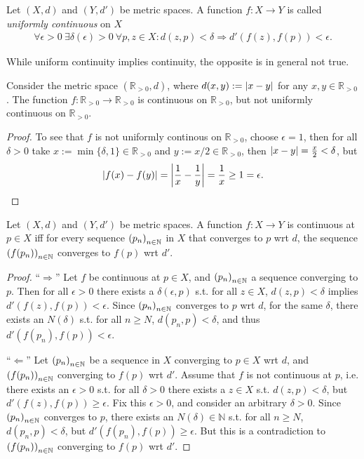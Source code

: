 \begin{defn}
	Let $(X, d)$ and $(Y, d')$ be metric spaces. A function $f: X\rightarrow Y$ is called \textit{uniformly continuous} on $X$
	\begin{align}
		\forall\epsilon > 0\ \exists \delta(\epsilon) > 0\ \forall p, z\in X: d\left(z, p\right) < \delta \Rightarrow d'\left( f\left(z\right), f\left(p\right) \right) < \epsilon.
	\end{align}
\end{defn}

\begin{remark}
	While uniform continuity implies continuity, the opposite is in general not true.
\end{remark}

\begin{exmp}
	Consider the metric space $(\mathbb R_{> 0}, d)$, where $d(x, y) := \abs{x - y}$ for any $x, y\in\mathbb R_{> 0}$. The function $f: \mathbb R_{>0} \to \mathbb R_{> 0}$ is continuous on $\mathbb R_{> 0}$, but not uniformly continuous on $\mathbb R_{> 0}$. 
\end{exmp}

\begin{proof}
	To see that $f$ is not uniformly continous on $\mathbb R_{> 0}$, choose $\epsilon = 1$, then for all $\delta > 0$ take $x := \min\{\delta, 1\}\in\mathbb R_{> 0}$ and $y := x/2\in\mathbb R_{> 0}$, then $\abs{x - y} = \frac{x}{2} < \delta$, but
	$$\abs{f(x) - f(y)} = \abs{\frac{1}{x} - \frac{1}{y}} = \frac{1}{x} \geq 1 = \epsilon.$$
\end{proof}

\begin{theorem}
	Let $(X, d)$ and $(Y, d')$ be metric spaces. A function $f: X\to Y$ is continuous at $p\in X$ iff for every sequence $\seq[p_n]$ in $X$ that converges to $p$ wrt $d$, the sequence $\seq[f(p_n)]$ converges to $f(p)$ wrt $d'$.
\end{theorem}

\begin{proof}
	\enquote{$\Longrightarrow$} Let $f$ be continuous at $p\in X$, and $\seq[p_n]$ a sequence converging to $p$. Then for all $\epsilon > 0$ there exists a $\delta(\epsilon, p)$ s.t. for all $z\in X$, $d(z, p) < \delta$ implies $d'(f(z), f(p)) < \epsilon$. Since $\seq[p_n]$ converges to $p$ wrt $d$, for the same $\delta$, there exists an $N(\delta)$ s.t. for all $n\geq N$, $d(p_n, p) < \delta$, and thus $d'(f(p_n), f(p)) < \epsilon$.
	
	\enquote{$\Longleftarrow$} Let $\seq[p_n]$ be a sequence in $X$ converging to $p\in X$ wrt $d$, and $\seq[f(p_n)]$ converging to $f(p)$ wrt $d'$. Assume that $f$ is not continuous at $p$, i.e. there exists an $\epsilon > 0$ s.t. for all $\delta > 0$ there exists a $z\in X$ s.t. $d(z, p) < \delta$, but $d'(f(z), f(p)) \geq \epsilon$. Fix this $\epsilon > 0$, and consider an arbitrary $\delta > 0$. Since $\seq[p_n]$ converges to $p$, there exists an $N(\delta)\in\mathbb N$ s.t. for all $n\geq N$, $d(p_n, p) < \delta$, but $d'(f(p_n), f(p)) \geq \epsilon$. But this is a contradiction to $\seq[f(p_n)]$ converging to $f(p)$ wrt $d'$.
\end{proof}

